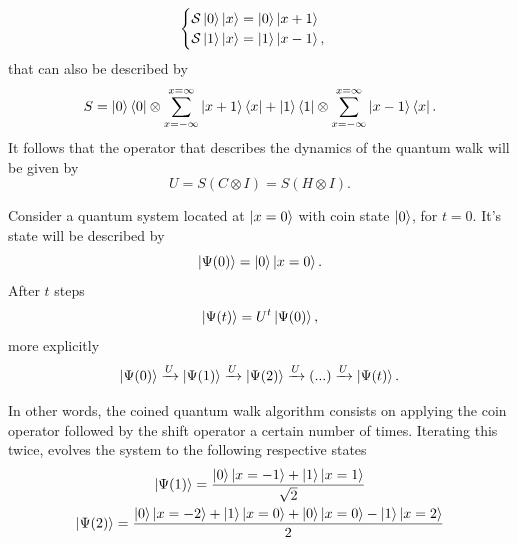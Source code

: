\documentclass[../../dissertation.tex]{subfiles}
\begin{document}
\begin{equation}
	\begin{cases}
		\mathcal{S} \ket{0}\ket{x} = \ket{0}\ket{x+1}\\
		\mathcal{S} \ket{1}\ket{x} = \ket{1}\ket{x-1},
	\end{cases}
\end{equation}
that can also be described by
\begin{equation}
	S = \ket{0}\bra{0} \otimes \sum_{x=-\infty}^{x=\infty} \ket{x+1}\bra{x} + \ket{1}\bra{1}\otimes \sum_{x=-\infty}^{x=\infty} \ket{x-1}\bra{x}.
	\label{eq:coinedShiftOperator}
\end{equation}
It follows that the operator that describes the dynamics of the quantum walk will be given by 
\begin{equation}
	U = S(C\otimes I) = S(H\otimes I). 
	\label{eq:coinedUnmarkedOperator}
\end{equation}\par
Consider a quantum system located at $\ket{x = 0}$ with coin state $\ket{0}$, for $t=0$. It's state will be described by
\begin{equation}
	\ket{\Psi(0)} = \ket{0}\ket{x=0}.
	\label{eq:coinedQWInitCond0}
\end{equation}
After $t$ steps 
\begin{equation}
	\ket{\Psi(t)}=U^{t}\ket{\Psi(0)},
\end{equation}
more explicitly
\begin{equation}
	\ket{\Psi(0)}\xrightarrow[]{\text{$U$}}\ket{\Psi(1)}\xrightarrow[]{\text{$U$}}\ket{\Psi(2)}\xrightarrow[]{\text{$U$}} (...) \xrightarrow[]{\text{$U$}}\ket{\Psi(t)}.
\end{equation}\par
In other words, the coined quantum walk algorithm consists on applying the coin operator followed by the shift operator a certain number of times. Iterating this twice, evolves the system to the following respective states
\begin{gather}
	\ket{\Psi(1)} = \frac{\ket{0}\ket{x=-1}+\ket{1}\ket{x=1}}{\sqrt{2}}\label{eq:10}\\
	\ket{\Psi(2)} = \frac{\ket{0}\ket{x=-2}+\ket{1}\ket{x=0}+\ket{0}\ket{x=0}-\ket{1}\ket{x=2}}{2}\label{eq:11}\\
\end{gather}
\end{document}
